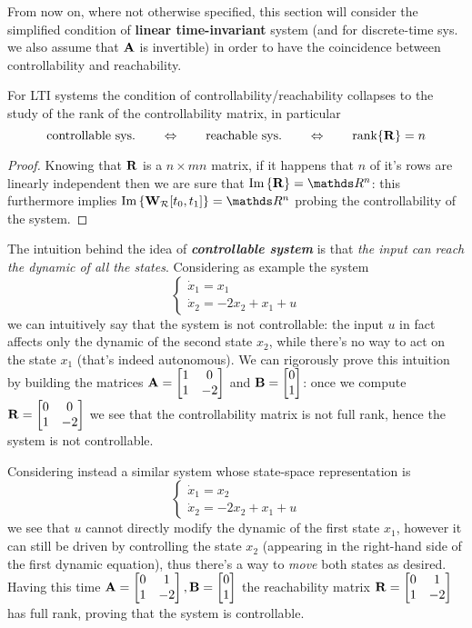 	From now on, where not otherwise specified, this section will consider the simplified condition of \textbf{linear time-invariant} system (and for discrete-time sys. we also assume that $\mathbf{A}$ is invertible) in order to have the coincidence between controllability and reachability.
	
	For LTI systems the condition of controllability/reachability collapses to the study of the rank of the controllability matrix, in particular
	\begin{equation} \label{eq:gram:temp5}
		\textrm{controllable sys.} \qquad \Leftrightarrow \qquad \textrm{reachable sys.} \qquad \Leftrightarrow \qquad \textrm{rank}\{\mathbf{R}\} = n
	\end{equation}
	\begin{proof}
		Knowing that $\mathbf{R}$ is a $n\times mn$ matrix, if it happens that $n$ of it's rows are linearly independent then we are sure that $\image{\R} = \mathds R^n$: this furthermore implies $\image{\rgram[t_0,t_1]} = \mathds R^n$ probing the controllability of the system.
	\end{proof}
	The intuition behind the idea of \textbf{\textit{controllable system}} is that \textit{the input can reach the dynamic of all the states}. Considering as example the system
	\[ \begin{cases}
		\dot x_1 = x_1 \\ \dot x_2 = - 2x_2 + x_1 + u
	\end{cases} \]
	we can intuitively say that the system is not controllable: the input $u$ in fact affects only the dynamic of the second state $x_2$, while there's no way to act on the state $x_1$ (that's indeed autonomous). We can rigorously prove this intuition by building the matrices $\mathbf{A}= \begin{bmatrix} 1 & 0 \\ 1 & - 2 \end{bmatrix}$ and $\mathbf{B}= \begin{bmatrix} 0 \\ 1 \end{bmatrix}$: once we compute $\mathbf{R} = \begin{bmatrix}  0 & 0 \\ 1 & - 2 \end{bmatrix}$ we see that the controllability matrix is not full rank, hence the system is not controllable.
	
	Considering instead a similar system whose state-space representation is
	\[ \begin{cases}
		\dot x_1 = x_2 \\ \dot x_2 = - 2x_2 + x_1 + u
	\end{cases} \]
	we see that $u$ cannot directly modify the dynamic of the first state $x_1$, however it can still be driven by controlling the state $x_2$ (appearing in the right-hand side of the first dynamic equation), thus there's a way to \textit{move} both states as desired. Having this time $\mathbf{A} = \begin{bmatrix} 0 & 1 \\ 1 & -2 \end{bmatrix}, \mathbf{B} = \begin{bmatrix} 0\\1 \end{bmatrix}$ the reachability matrix $\mathbf{R}=\begin{bmatrix} 0 & 1 \\ 1 & -2 \end{bmatrix}$ has full rank, proving that the system is controllable.
	
